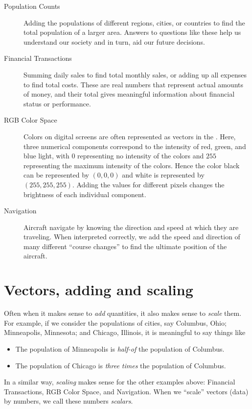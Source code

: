 \documentclass{ximera}
\begin{document}
\begin{concept}
\begin{description}
\item[Population Counts] Adding the populations of different regions,
  cities, or countries to find the total population of a larger
  area. Answers to questions like these help us understand our
  society and in turn, aid our future decisions.
\item[Financial Transactions] Summing daily sales to find total
  monthly sales, or adding up all expenses to find total costs. These
  are real numbers that represent actual amounts of money, and their
  total gives meaningful information about financial status or
  performance.
\item[RGB Color Space] Colors on digital screens are often represented
  as vectors in the .
  Here, three numerical components correspond to the intensity of red,
  green, and blue light, with $0$ representing no intensity of the
  colors and $255$ representing the maximum intensity of the
  colors. Hence the color black can be represented by $(0,0,0)$ and
  white is represented by $(255,255,255)$.  Adding the values for
  different pixels changes the brightness of each individual
  component.
\item[Navigation] Aircraft navigate by knowing the direction and speed
  at which they are traveling. When interpreted correctly, we add the
  speed and direction of many different ``course changes'' to find the
  ultimate position of the aircraft.
\end{description}
\end{concept}



\section{Vectors, adding and scaling}


Often when it makes sense to \textit{add} quantities, it also makes
sense to \textit{scale} them. For example, if we consider the
populations of cities, say Columbus, Ohio; Minneapolis, Minnesota; and
Chicago, Illinois, it is meaningful to say things like
\begin{itemize}
\item The population of Minneapolis is \textit{half-of} the population of Columbus.
\item The population of Chicago is \textit{three times} the population of Columbus.
\end{itemize}
In a similar way, \textit{scaling} makes sense for the other examples
above: Financial Transactions, RGB Color Space, and Navigation. When
we ``scale'' vectors (data) by numbers, we call these numbers
\textit{scalars}.
\end{document}
